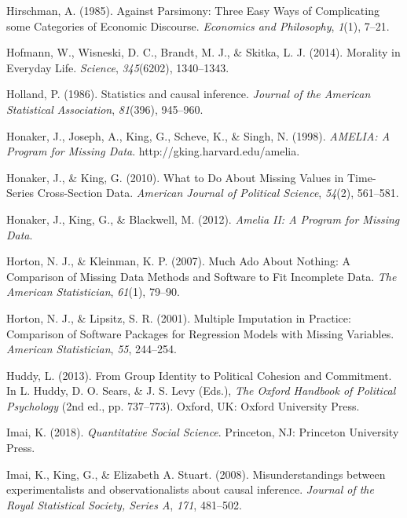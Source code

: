 \documentclass[12pt,econ]{sources/authesis}
\begin{document}
\leavevmode\hypertarget{ref-hirschman_against_1985}{}%
Hirschman, A. (1985). Against Parsimony: Three Easy Ways of Complicating some Categories of Economic Discourse. \emph{Economics and Philosophy}, \emph{1}(1), 7--21.

\leavevmode\hypertarget{ref-hofmann_2014_morality}{}%
Hofmann, W., Wisneski, D. C., Brandt, M. J., \& Skitka, L. J. (2014). Morality in Everyday Life. \emph{Science}, \emph{345}(6202), 1340--1343.

\leavevmode\hypertarget{ref-holland_1986_statistics}{}%
Holland, P. (1986). Statistics and causal inference. \emph{Journal of the American Statistical Association}, \emph{81}(396), 945--960.

\leavevmode\hypertarget{ref-honaker_1998_amelia}{}%
Honaker, J., Joseph, A., King, G., Scheve, K., \& Singh, N. (1998). \emph{AMELIA: A Program for Missing Data}. http://gking.harvard.edu/amelia.

\leavevmode\hypertarget{ref-honaker_2010_what}{}%
Honaker, J., \& King, G. (2010). What to Do About Missing Values in Time-Series Cross-Section Data. \emph{American Journal of Political Science}, \emph{54}(2), 561--581.

\leavevmode\hypertarget{ref-honaker_2012_amelia}{}%
Honaker, J., King, G., \& Blackwell, M. (2012). \emph{Amelia II: A Program for Missing Data}.

\leavevmode\hypertarget{ref-horton_2007_much}{}%
Horton, N. J., \& Kleinman, K. P. (2007). Much Ado About Nothing: A Comparison of Missing Data Methods and Software to Fit Incomplete Data. \emph{The American Statistician}, \emph{61}(1), 79--90.

\leavevmode\hypertarget{ref-horton_2001_multiple}{}%
Horton, N. J., \& Lipsitz, S. R. (2001). Multiple Imputation in Practice: Comparison of Software Packages for Regression Models with Missing Variables. \emph{American Statistician}, \emph{55}, 244--254.

\leavevmode\hypertarget{ref-huddy_2013_from}{}%
Huddy, L. (2013). From Group Identity to Political Cohesion and Commitment. In L. Huddy, D. O. Sears, \& J. S. Levy (Eds.), \emph{The Oxford Handbook of Political Psychology} (2nd ed., pp. 737--773). Oxford, UK: Oxford University Press.

\leavevmode\hypertarget{ref-imai_quantitative_2018}{}%
Imai, K. (2018). \emph{Quantitative Social Science}. Princeton, NJ: Princeton University Press.

\leavevmode\hypertarget{ref-imai_2008_misunderstandings}{}%
Imai, K., King, G., \& Elizabeth A. Stuart. (2008). Misunderstandings between experimentalists and observationalists about causal inference. \emph{Journal of the Royal Statistical Society, Series A}, \emph{171}, 481--502.
\end{document}
